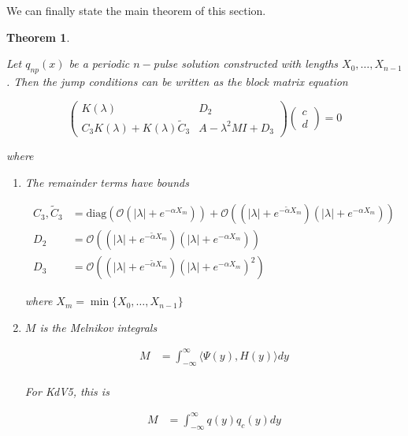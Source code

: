 \documentclass[12pt]{article}
\newtheorem{theorem}{Theorem}
\begin{document}

We can finally state the main theorem of this section.

\begin{theorem}\label{blockmatrixform}

Let $q_{np}(x)$ be a periodic $n-$pulse solution constructed with lengths $X_0, \dots, X_{n-1}$. Then the jump conditions can be written as the block matrix equation 

\begin{equation}\label{blockeq}
\begin{pmatrix}
K(\lambda) & D_2 \\
C_3 K(\lambda) + K(\lambda) \tilde{C}_3 & A - \lambda^2 MI + D_3
\end{pmatrix}
\begin{pmatrix}c \\ d \end{pmatrix} 
= 0
\end{equation}

where 

\begin{enumerate}

\item The remainder terms have bounds

\begin{align*}
C_3, \tilde{C}_3 &= \text{diag}(\mathcal{O}(|\lambda| + e^{-\alpha X_m})) 
+ \mathcal{O}((|\lambda| + e^{-\tilde{\alpha} X_m})( |\lambda| + e^{-\alpha X_m})) \\
D_2 &= \mathcal{O}((|\lambda| + e^{-\tilde{\alpha} X_m})(|\lambda| + e^{-\alpha X_m})) \\
D_3 &= \mathcal{O}((|\lambda| + e^{-\tilde{\alpha} X_m})(|\lambda| + e^{-\alpha X_m})^2)
\end{align*}

where $X_m = \min \{X_0, \dots, X_{n-1}\}$

\item $M$ is the Melnikov integrals

\begin{align*}
M &= \int_{-\infty}^\infty \langle \Psi(y), H(y) \rangle dy \\
\end{align*}

For KdV5, this is

\begin{align*}
M &= \int_{-\infty}^\infty q(y) q_c(y) dy \\
\end{align*}


\end{enumerate}
\end{theorem}
\end{document}

